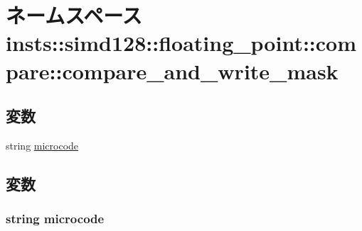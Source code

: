 \hypertarget{namespaceinsts_1_1simd128_1_1floating__point_1_1compare_1_1compare__and__write__mask}{
\section{ネームスペース insts::simd128::floating\_\-point::compare::compare\_\-and\_\-write\_\-mask}
\label{namespaceinsts_1_1simd128_1_1floating__point_1_1compare_1_1compare__and__write__mask}
}
\subsection*{変数}
\begin{DoxyCompactItemize}
\item 
string \hyperlink{namespaceinsts_1_1simd128_1_1floating__point_1_1compare_1_1compare__and__write__mask_a770f11a173e99389a8802f0107ed8f52}{microcode}
\end{DoxyCompactItemize}


\subsection{変数}
\hypertarget{namespaceinsts_1_1simd128_1_1floating__point_1_1compare_1_1compare__and__write__mask_a770f11a173e99389a8802f0107ed8f52}{
\subsubsection[{microcode}]{\setlength{\rightskip}{0pt plus 5cm}string {\bf microcode}}}
\label{namespaceinsts_1_1simd128_1_1floating__point_1_1compare_1_1compare__and__write__mask_a770f11a173e99389a8802f0107ed8f52}
